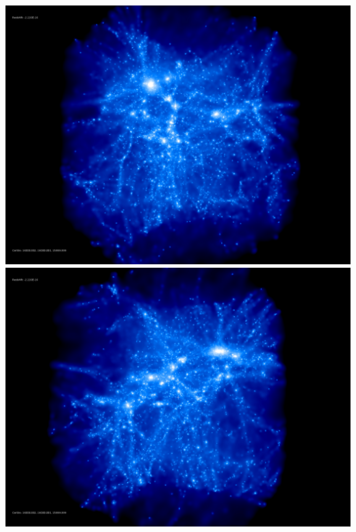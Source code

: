 \includegraphics[scale=0.1]{stages_18/rotate_00074.jpg} 
\includegraphics[scale=0.1]{stages_18/rotate_00131.jpg}

